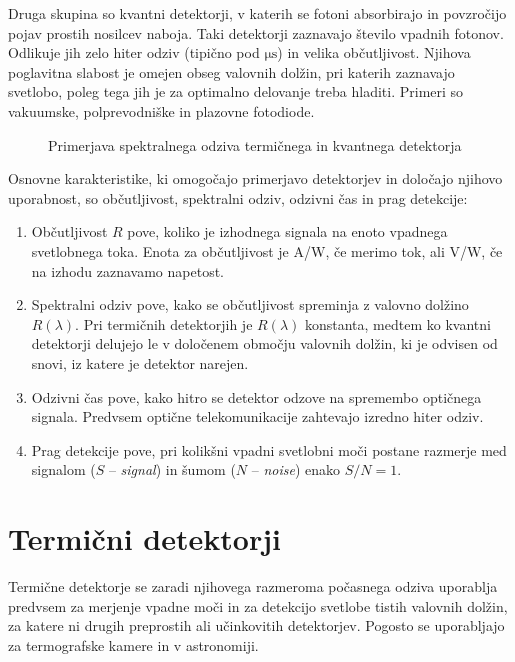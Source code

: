 Druga skupina so kvantni detektorji, v katerih se
fotoni absorbirajo in povzročijo pojav prostih nosilcev naboja. Taki detektorji
zaznavajo število vpadnih fotonov. Odlikuje jih zelo hiter odziv 
(tipično pod $\si{\micro\second}$)
in velika občutljivost. Njihova poglavitna slabost je omejen obseg valovnih dolžin,
pri katerih zaznavajo svetlobo, poleg tega jih je za optimalno delovanje treba 
hladiti. Primeri so vakuumske, polprevodniške in plazovne fotodiode.
\begin{figure}[h]
\centering
\def\svgwidth{65truemm} 

\caption{Primerjava spektralnega odziva termičnega in kvantnega detektorja}
\label{fig:shemaTermKv}
\end{figure}

Osnovne karakteristike, ki omogočajo primerjavo detektorjev in določajo njihovo uporabnost,
so občutljivost, spektralni odziv, odzivni čas in prag detekcije:

\begin{enumerate}
\item Občutljivost $R$ pove, koliko je izhodnega signala 
na enoto vpadnega svetlobnega toka. Enota za občutljivost je A/W, če merimo tok, ali V/W, 
če na izhodu zaznavamo napetost. 
\item Spektralni odziv pove, kako se občutljivost spreminja z valovno dolžino $R(\lambda)$.
Pri termičnih detektorjih je $R(\lambda)$ konstanta, medtem ko kvantni detektorji 
delujejo le v določenem območju valovnih dolžin, ki je odvisen od snovi, 
iz katere je detektor narejen. 
\item Odzivni čas pove, kako hitro se detektor odzove na spremembo optičnega signala. Predvsem 
optične telekomunikacije zahtevajo izredno hiter odziv.
\item Prag detekcije pove, pri kolikšni vpadni svetlobni moči postane razmerje med signalom ($S$ --
{\it signal}) in šumom ($N$ -- {\it noise}) enako $S/N = 1$. 
\end{enumerate}

\section{Termični detektorji}
Termične detektorje se zaradi njihovega razmeroma počasnega odziva uporablja predvsem 
za merjenje vpadne moči in za detekcijo svetlobe tistih valovnih dolžin, za katere 
ni drugih preprostih ali učinkovitih detektorjev. Pogosto se uporabljajo za termografske 
kamere in v astronomiji.

